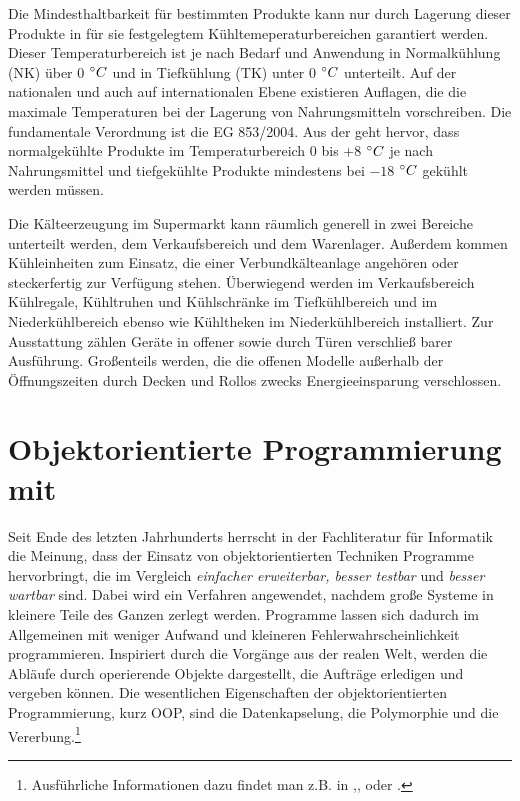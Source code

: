 Die Mindesthaltbarkeit f\"ur bestimmten Produkte kann nur durch Lagerung
dieser Produkte in f\"ur sie festgelegtem K\"uhltemeperaturbereichen
garantiert werden. Dieser Temperaturbereich ist je nach Bedarf und Anwendung in
Normalk\"uhlung (NK) über 0 $^\circ C$ und in
Tiefk\"uhlung (TK) unter 0 $^\circ C$ unterteilt. Auf der
nationalen und auch auf internationalen Ebene existieren Auflagen, die die
maximale Temperaturen bei der Lagerung von Nahrungsmitteln vorschreiben. Die
fundamentale Verordnung ist die EG 853/2004. Aus der geht hervor, dass
normalgekühlte Produkte im Temperaturbereich 0 bis $+8$ $^\circ C$ je nach
Nahrungsmittel und tiefgekühlte Produkte mindestens bei $-18$ $^\circ C$ gekühlt
werden müssen.

Die K\"alteerzeugung im Supermarkt kann r\"aumlich generell in zwei Bereiche
unterteilt werden, dem Verkaufsbereich und dem Warenlager. Au\ss erdem kommen
K\"uhleinheiten zum Einsatz, die einer Verbundk\"alteanlage angeh\"oren oder
steckerfertig zur Verf\"ugung stehen. \"Uberwiegend werden im Verkaufsbereich
K\"uhlregale, K\"uhltruhen und K\"uhlschr\"anke im Tiefk\"uhlbereich und im
Niederk\"uhlbereich ebenso wie K\"uhltheken im Niederk\"uhlbereich installiert.
Zur Ausstattung z\"ahlen Ger\"ate in offener sowie durch T\"uren verschlie\ss
barer Ausf\"uhrung. Gro\ss enteils werden, die die offenen Modelle au\ss erhalb
der \"Offnungszeiten durch Decken und Rollos zwecks Energieeinsparung
verschlossen.


\section{Objektorientierte Programmierung mit \matlab}
\label{sec:OOP}
Seit Ende des letzten Jahrhunderts herrscht in der Fachliteratur für Informatik
die Meinung, dass der Einsatz von objektorientierten Techniken Programme
hervorbringt, die im Vergleich \textit{einfacher erweiterbar, besser testbar}
und \textit{besser wartbar} sind. Dabei wird ein Verfahren angewendet, nachdem
große Systeme in kleinere Teile des Ganzen zerlegt werden. Programme lassen sich
dadurch im Allgemeinen mit weniger Aufwand und kleineren
Fehlerwahrscheinlichkeit programmieren. Inspiriert durch die Vorgänge aus der
realen Welt, werden die Abläufe durch operierende Objekte dargestellt, die
Aufträge erledigen und vergeben können. Die wesentlichen Eigenschaften der
objektorientierten Programmierung, kurz OOP, sind die Datenkapselung, die Polymorphie und die
Vererbung.\footnote{ Ausführliche Informationen dazu findet
man z.B. in \cite{OOP},\cite{pepperOOP},\cite{java} oder \cite{python}.}

